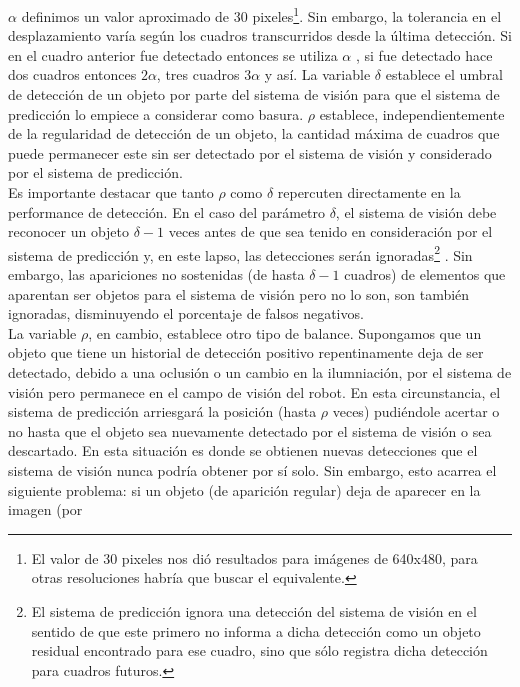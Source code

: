 $\alpha$ definimos un valor aproximado de 30 pixeles\footnote{ El 
valor de 30 pixeles nos di\'o resultados para im\'agenes de 640x480, para 
otras resoluciones habr\'ia que buscar el equivalente.}. Sin embargo, la 
tolerancia en el desplazamiento var\'ia seg\'un los cuadros transcurridos desde la \'ultima 
detecci\'on. Si en el cuadro anterior fue detectado entonces se utiliza 
$\alpha$ , si fue detectado hace dos cuadros entonces $2\alpha$, tres 
cuadros $3\alpha$ y as\'i. La variable $\delta$ establece el umbral de 
detecci\'on de un objeto por parte del sistema de visi\'on para que el 
sistema de predicci\'on lo empiece  a considerar como basura. $\rho$ establece, 
independientemente de la  
regularidad de detecci\'on de un objeto, la cantidad m\'axima de cuadros que puede 
permanecer este sin ser detectado por el sistema de visi\'on y 
considerado por el sistema de predicci\'on. \\  	
\indent Es importante destacar que tanto $\rho$ como $\delta$ repercuten directamente en la 
performance de detecci\'on. En el caso del par\'ametro $\delta$, el 
sistema de visi\'on debe reconocer un objeto $\delta -1$ veces antes de que sea 
tenido en consideraci\'on por el sistema de predicci\'on y, en este lapso, las 
detecciones ser\'an ignoradas\footnote{El sistema de predicci\'on ignora 
una detecci\'on del sistema de visi\'on en el sentido de que este primero 
no informa a dicha detecci\'on como un objeto residual encontrado para 
ese cuadro, sino que s\'olo registra dicha detecci\'on para 
cuadros futuros.} . Sin embargo, las apariciones no sostenidas 
(de hasta $\delta -1$ cuadros) de elementos que aparentan ser objetos 
para el sistema de visi\'on pero no lo son, son tambi\'en ignoradas, 
disminuyendo el porcentaje de falsos negativos.\\
\indent La variable $\rho$, en cambio, establece otro tipo de balance. 
Supongamos que un objeto que tiene un historial de detecci\'on 
positivo repentinamente deja de ser detectado, debido a una oclusi\'on 
o un cambio en la ilumniaci\'on, por el sistema de visi\'on 
pero permanece en el campo de visi\'on del robot. En esta 
circunstancia, el sistema de predicci\'on 
arriesgar\'a la posici\'on (hasta $\rho$ veces) pudi\'endole acertar o no hasta que el objeto 
sea nuevamente detectado por el sistema de visi\'on o sea descartado.
En esta situaci\'on es donde se obtienen nuevas detecciones que el 
sistema de visi\'on nunca podr\'ia obtener por s\'i solo. Sin embargo, 
esto acarrea el siguiente problema: si un objeto (de aparici\'on regular) deja de aparecer en la imagen (por 
